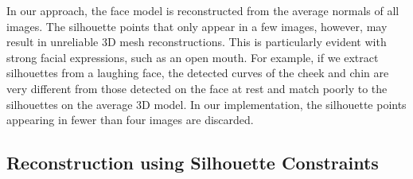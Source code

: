 In our approach, the face model is reconstructed from the average normals of all images. The silhouette points that only appear in a few images, however, may result in unreliable 3D mesh reconstructions. This is particularly evident with strong facial expressions, such as an open mouth. For example, if we extract silhouettes from a laughing face, the detected curves of the cheek and chin are very different from those detected on the face at rest and match poorly to the silhouettes on the average 3D model. %
In our implementation, the silhouette points appearing in fewer than four images are discarded.


% 

\subsection{Reconstruction using Silhouette Constraints}

